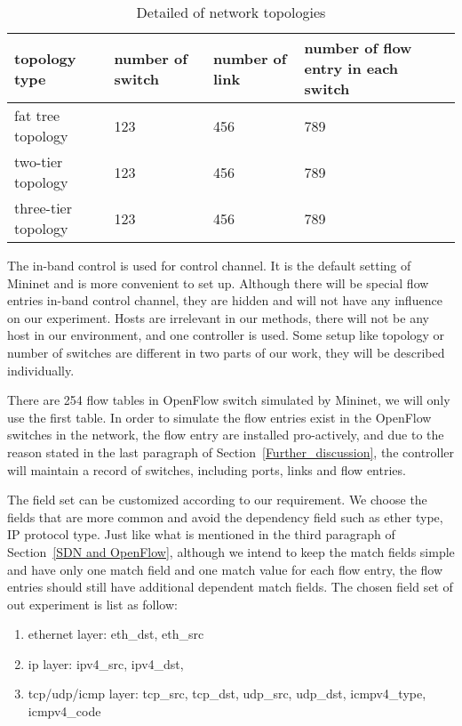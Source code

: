 \begin{table}[H]
\centering
\caption{Detailed of network topologies}
\begin{tabular}{|l|p{4cm}|p{4.5cm}|p{4.5cm}|}
\hline  topology type & number of switch & number of link & number of flow entry in each switch \\
\hline fat tree topology & 123 & 456 & 789	\\
\hline two-tier topology & 123 & 456 & 789	\\
\hline three-tier topology & 123 & 456 & 789	\\
\hline 
\end{tabular}
\label{table:network_env}
\end{table}


The in-band control is used for control channel. It is the default setting of Mininet and is more convenient to set up. Although there will be special flow entries in-band control channel, they are hidden and will not have any influence on our experiment. Hosts are irrelevant in our methods, there will not be any host in our environment, and one controller is used. Some setup like topology or number of switches are different in two parts of our work, they will be described individually.

There are 254 flow tables in OpenFlow switch simulated by Mininet, we will only use the first table. In order to simulate the flow entries exist in the OpenFlow switches in the network, the flow entry are installed pro-actively, and due to the reason stated in the last paragraph of Section~\ref{Further_discussion}, the controller will maintain a record of switches, including ports, links and flow entries. 

The field set can be customized according to our requirement. We choose the fields that are more common and avoid the dependency field such as ether type, IP protocol type. Just like what is mentioned in the third paragraph of Section~\ref{SDN and OpenFlow}, although we intend to keep the match fields simple and have only one match field and one match value for each flow entry, the flow entries should still have additional dependent match fields. The chosen field set of out experiment is list as follow:
\begin{enumerate}
\item
ethernet layer: eth_dst, eth_src
\item
ip layer: ipv4_src, ipv4_dst, 
\item
tcp/udp/icmp layer: tcp_src, tcp_dst, udp_src, udp_dst, icmpv4_type, icmpv4_code
\end{enumerate}

